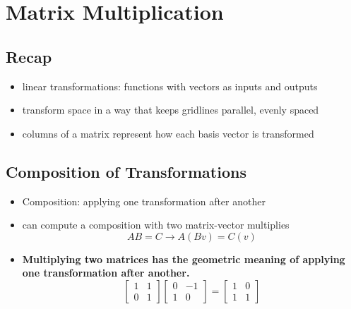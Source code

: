 \section{Matrix Multiplication}
\subsection{Recap}
\begin{itemize}
    \item linear transformations: functions with vectors as inputs and outputs
    \item transform space in a way that keeps gridlines parallel, evenly spaced
    \item columns of a matrix represent how each basis vector is transformed
\end{itemize}

\subsection{Composition of Transformations}

\begin{itemize}
    \item Composition: applying one transformation after another
    \item can compute a composition with two matrix-vector multiplies
    $$ AB = C \rightarrow A(Bv) = C(v) $$
    \item \textbf{Multiplying two matrices has the geometric meaning of applying one transformation after another.}
    $$ \begin{bmatrix}
    1 & 1 \\
    0 & 1 
    \end{bmatrix}
    \begin{bmatrix}
    0 & -1 \\
    1 & 0 
    \end{bmatrix}
    = \begin{bmatrix}
    1 & 0 \\
    1 & 1
    \end{bmatrix} $$
\end{itemize}